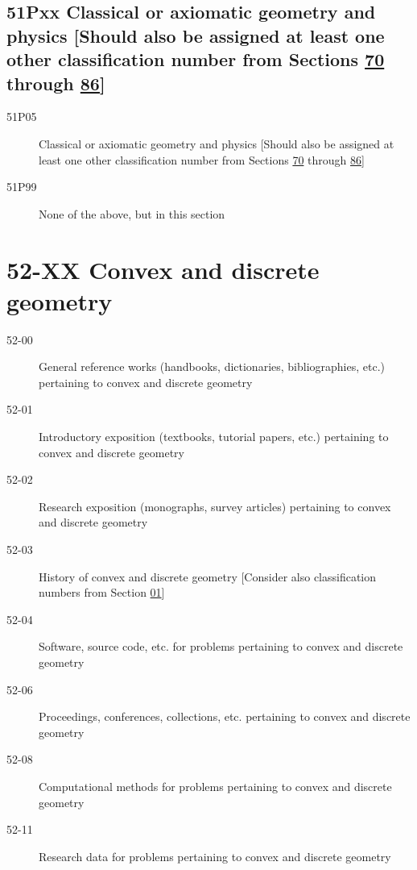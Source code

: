 \documentclass[letterpaper]{article}
\begin{document}
\subsection*{51Pxx Classical or axiomatic geometry and physics [Should also be assigned at least one other classification number from Sections \hyperref[70-XX]{70} through \hyperref[86-XX]{86}] }\label{51Pxx}
\begin{description} 
\item [51P05]\label{51P05} Classical or axiomatic geometry and physics [Should also be assigned at least one other classification number from Sections \hyperref[70-XX]{70} through \hyperref[86-XX]{86}]
\item [51P99]\label{51P99} None of the above, but in this section
\end{description}
\section*{52-XX Convex and discrete geometry }\label{52-XX}
\begin{description}
\item [52-00]\label{52-00} General reference works (handbooks, dictionaries, bibliographies, etc.) pertaining to convex and discrete geometry
\item [52-01]\label{52-01} Introductory exposition (textbooks, tutorial papers, etc.) pertaining to convex and discrete geometry
\item [52-02]\label{52-02} Research exposition (monographs, survey articles) pertaining to convex and discrete geometry
\item [52-03]\label{52-03} History of convex and discrete geometry [Consider also classification numbers from Section \hyperref[01-XX]{01}]
\item [52-04]\label{52-04} Software, source code, etc. for problems pertaining to convex and discrete geometry
\item [52-06]\label{52-06} Proceedings, conferences, collections, etc. pertaining to convex and discrete geometry
\item [52-08]\label{52-08} Computational methods for problems pertaining to convex and discrete geometry
\item [52-11]\label{52-11} Research data for problems pertaining to convex and discrete geometry
\end{description}
\end{document}
